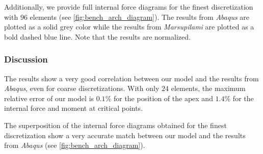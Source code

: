 Additionally, we provide full internal force diagrams for the finest discretization with $96$ elements (see \cref{fig:bench_arch_diagram}). The results from \emph{Abaqus} are plotted as a solid grey color while the results from \emph{Marsupilami} are plotted as a bold dashed blue line. Note that the results are normalized.


\subsubsection{Discussion}

The results show a very good correlation between our model and the results from \emph{Abaqus}, even for coarse discretizations. With only $24$ elements, the maximum relative error of our model is $0.1\%$ for the position of the apex and $1.4\%$ for the internal force and moment at critical points.

The superposition of the internal force diagrams obtained for the finest discretization show a very accurate match between our model and the results from \emph{Abaqus} (see \cref{fig:bench_arch_diagram}).

\clearpage

